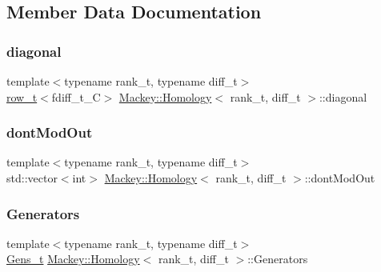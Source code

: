 \subsection{Member Data Documentation}
\mbox{\label{classMackey_1_1Homology_acff409513ea412c16b84f304d097059b}} 
\subsubsection{\texorpdfstring{diagonal}{diagonal}}
{\footnotesize\ttfamily template$<$typename rank\+\_\+t, typename diff\+\_\+t$>$ \\
\hyperlink{namespaceMackey_a6d37801553e585770ca7d1243ab3b213}{row\+\_\+t}$<$fdiff\+\_\+t\+\_\+C$>$ \hyperlink{classMackey_1_1Homology}{Mackey\+::\+Homology}$<$ rank\+\_\+t, diff\+\_\+t $>$\+::diagonal}

\mbox{\label{classMackey_1_1Homology_a21c18ecdeea401821a56c7c00569190b}} 
\subsubsection{\texorpdfstring{dont\+Mod\+Out}{dontModOut}}
{\footnotesize\ttfamily template$<$typename rank\+\_\+t, typename diff\+\_\+t$>$ \\
std\+::vector$<$int$>$ \hyperlink{classMackey_1_1Homology}{Mackey\+::\+Homology}$<$ rank\+\_\+t, diff\+\_\+t $>$\+::dont\+Mod\+Out}

\mbox{\label{classMackey_1_1Homology_abceae7827c633cec7a9892826240c9cd}} 
\subsubsection{\texorpdfstring{Generators}{Generators}}
{\footnotesize\ttfamily template$<$typename rank\+\_\+t, typename diff\+\_\+t$>$ \\
\hyperlink{classMackey_1_1Homology_a986c3a6644aa52dc8279a26ade42fd64}{Gens\+\_\+t} \hyperlink{classMackey_1_1Homology}{Mackey\+::\+Homology}$<$ rank\+\_\+t, diff\+\_\+t $>$\+::Generators}



